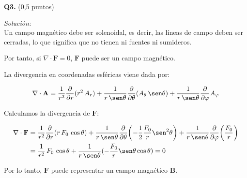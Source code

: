 \textbf{Q3.} (0,5 puntos)


\vspace{20px}
\textit{Solución:}
\\

Un campo magnético debe ser solenoidal, es decir, las líneas de campo deben ser cerradas, lo que significa que no tienen
ni fuentes ni sumideros.

Por tanto, si $\nabla \cdot \textbf{F} = 0$, $\textbf{F}$ puede ser un campo magnético.

La divergencia en coordenadas esféricas viene dada por:

\begin{equation*}
    \nabla \cdot \textbf{A} = \frac{1}{r^2} \frac{\partial}{\partial r} ( r^2 \, A_r) +
    \frac{1}{r \, \sen\theta} \frac{\partial}{\partial\theta}
    (A_\theta \, \sen\theta )
    +     \frac{1}{r \, \sen\theta} \frac{\partial}{\partial\varphi} A_{\varphi}
\end{equation*}

Calculamos la divergencia de $\textbf{F}$:

\begin{align*}
    \nabla \cdot \textbf{F} & = \frac{1}{r^2} \frac{\partial}{\partial r} ( r\,F_0 \, \cos\theta) +
    \frac{1}{r \, \sen\theta} \frac{\partial}{\partial\theta}
    \biggl(
    - \frac{1}{2}  \frac{F_0}{r} \sen^2{\theta}
    \biggr)
    + \frac{1}{r \, \sen\theta} \frac{\partial}{\partial \varphi}
    \biggl(
    \frac{F_0}{r}
    \biggr) \\
    & = \frac{1}{r^2} \, F_0 \, \cos\theta + \frac{1}{r\, \sen\theta} ( - \frac{F_0}{r} \sen\theta \cos\theta ) = 0
\end{align*}

Por lo tanto, $\textbf{F}$ puede representar un campo magnético $\textbf{B}$.
